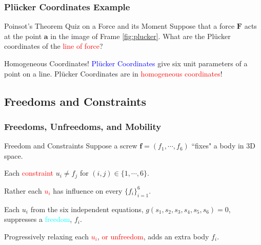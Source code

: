 \begin{frame}
	\frametitle{Pl{\"u}cker Coordinates Example}
	\begin{block}{Poinsot's Theorem Quiz on a  Force and its Moment}
		Suppose that a force $\bm{F}$  acts at the point $\bm{a}$ in the image of Frame \ref{fig:plucker}. What are the Pl{\"u}cker coordinates of the \textcolor{red}{line of force}?
	\end{block}
	\begin{block}{ Homogeneous Coordinates!}
		\textcolor{blue}{Pl{\"u}cker Coordinates} give six unit parameters of a point on a line. Pl{\"u}cker Coordinates are in \textcolor{red}{homogeneous coordinates}!
	\end{block}
\end{frame}


\subsection{Freedoms and Constraints}
\begin{frame}
	\frametitle{Freedoms, Unfreedoms, and Mobility}
	\begin{block}{Freedom and Constraints}
		Suppose a screw $\bm{f}=(f_1,\cdots, f_6)$ ``fixes" a body in 3D space. 
		\begin{description}
			\item Each \textcolor{red}{constraint} $u_i \neq f_j$ for $(i,j)\in \{1,\cdots,6\}$.
			\item Rather each \textcolor{red}{$u_i$} has influence on every $\{f_i\}_{i=1}^{6}$.
			\item Each $u_i$ from the six independent equations, $g(s_1, s_2, s_3, s_4, s_5, s_6)=0$, suppresses a \textcolor{cyan}{freedom}, $f_i$.
			\item Progressively relaxing each \textcolor{red}{$u_i$}, \textcolor{red}{or unfreedom}, adds an extra body $f_i$.
		\end{description}
	\end{block}
\end{frame}


